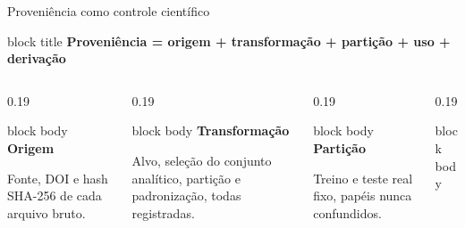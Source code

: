 \begin{frame}{Proveniência como controle científico}
  \begin{beamercolorbox}[wd=\linewidth,sep=.10cm,rounded=true]{block title}
    \centering\sffamily\bfseries\fontsize{10.5}{12.6}\selectfont
    Proveniência = origem + transformação + partição + uso + derivação
  \end{beamercolorbox}

  \vspace{.12cm}
  \begin{columns}[T,onlytextwidth]
    \begin{column}{0.19\textwidth}
      \begin{beamercolorbox}[wd=\linewidth,sep=.11cm,rounded=true]{block body}
        {\sffamily\bfseries\fontsize{8.8}{10.4}\selectfont\color{CoInfoBlue}Origem}\par\vspace{.04cm}
        {\fontsize{7.7}{9.2}\selectfont Fonte, DOI e hash SHA-256 de cada arquivo bruto.}
      \end{beamercolorbox}
    \end{column}
    \begin{column}{0.19\textwidth}
      \begin{beamercolorbox}[wd=\linewidth,sep=.11cm,rounded=true]{block body}
        {\sffamily\bfseries\fontsize{8.8}{10.4}\selectfont\color{CoInfoBlue}Transformação}\par\vspace{.04cm}
        {\fontsize{7.7}{9.2}\selectfont Alvo, seleção do conjunto analítico, partição e padronização, todas registradas.}
      \end{beamercolorbox}
    \end{column}
    \begin{column}{0.19\textwidth}
      \begin{beamercolorbox}[wd=\linewidth,sep=.11cm,rounded=true]{block body}
        {\sffamily\bfseries\fontsize{8.8}{10.4}\selectfont\color{CoInfoBlue}Partição}\par\vspace{.04cm}
        {\fontsize{7.7}{9.2}\selectfont Treino e teste real fixo, papéis nunca confundidos.}
      \end{beamercolorbox}
    \end{column}
    \begin{column}{0.19\textwidth}
      \begin{beamercolorbox}[wd=\linewidth,sep=.11cm,rounded=true]{block body}

\end{beamercolorbox}
\end{column}
\end{columns}
\end{frame}
